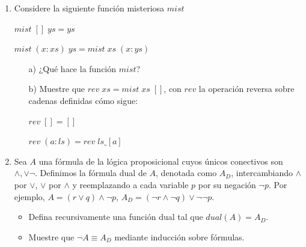 \documentclass[letterpaper,11pt]{article}
\begin{document}
\begin{enumerate}
    \item Considere la siguiente función misteriosa $mist$
    \begin{center}
        $mist \; [] \; ys = ys$

        $mist \; (x : xs) \;  ys = mist \; xs \; (x : ys)$
    \end{center}

    \begin{itemize}
        \item[a)] ¿Qué hace la función $mist$?
        \item[b)] Muestre que $rev \; xs = mist \; xs \; []$, con $rev$ la 
        operación reversa sobre cadenas definidas cómo sigue: 
        \begin{center}
            $rev \; [] = []$

            $rev \; (a : ls) = rev \; ls\_[a]$
        \end{center}
    \end{itemize}

    \item Sea $A$ una fórmula de la lógica proposicional cuyos únicos 
    conectivos son $\land, \lor \neg$. Definimos la fórmula dual de $A$, 
    denotada como $A_{D}$, intercambiando $\land$ por $\lor$, $\lor$ por 
    $\land$ y reemplazando a cada variable $p$ por su negación $\neg p$.
    Por ejemplo, $A = (r \lor q) \land \neg p$, $A_{D} = (\neg r \land \neg q)
    \lor \neg \neg p$.
    \begin{itemize}
        \item Defina recursivamente una función dual tal que $dual(A) = A_{D}$.
        \item Muestre que $\neg A \equiv A_{D}$ mediante inducción sobre 
        fórmulas.
    \end{itemize}


\end{enumerate}
\end{document}
